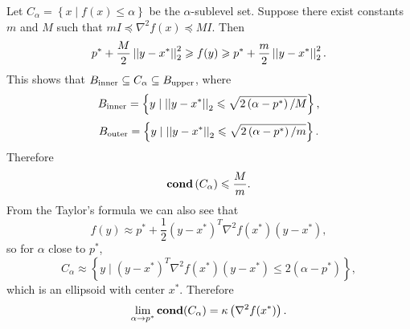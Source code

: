 \documentclass[12pt]{article}
\begin{document}
Let \(C_\alpha=\left\{x\mid f(x)\leqslant\alpha\right\}\) be the \(\alpha\)-sublevel set. Suppose there exist constants \(m\) and \(M\) such that \(mI\preceq\nabla^2f(x)\preceq MI\). Then
\[p^\ast+\frac M2\left|\left|y-x^\ast\right|\right|_2^2\geqslant f(y)\geqslant p^\ast+\frac m2\left|\left|y-x^\ast\right|\right|_2^2.\]
This shows that \(B_{\textnormal{inner}}\subseteq C_\alpha\subseteq B_{\textnormal{upper}}\), where
\[B_{\textnormal{inner}}=\left\{y\mid\left|\left|y-x^\ast\right|\right|_2\leqslant\sqrt{2\left(\alpha-p^\ast\right)/M}\right\},\]
\[B_{\textnormal{outer}}=\left\{y\mid\left|\left|y-x^\ast\right|\right|_2\leqslant\sqrt{2\left(\alpha-p^\ast\right)/m}\right\}.\]
Therefore
\[\operatorname{\mathbf{cond}}\left(C_\alpha\right)\leqslant\frac Mm.\]
From the Taylor's formula we can also see that
\[f(y)\approx p^\ast+\frac12\left(y-x^\ast\right)^T\nabla^2f(x^\ast)(y-x^\ast),\]
so for \(\alpha\) close to \(p^\ast\),
\[C_\alpha\approx\left\{y\mid (y-x^\ast)^T\nabla^2f(x^\ast)(y-x^\ast)\leqslant 2(\alpha-p^\ast)\right\},\]
which is an ellipsoid with center \(x^\ast\). Therefore
\[\lim_{\alpha\to p^\ast}\operatorname{\mathbf{cond}}(C_\alpha)=\kappa\left(\nabla^2 f(x^\ast)\right).\]
\end{document}
